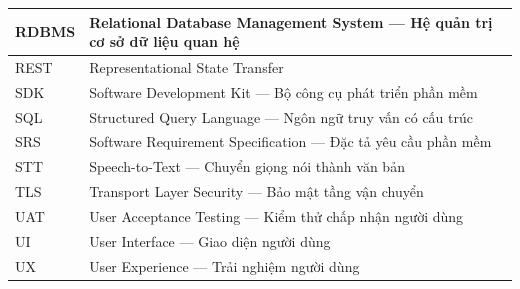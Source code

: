 \begin{tabularx}{\textwidth}{|l|X|}
RDBMS & Relational Database Management System --- Hệ quản trị cơ sở dữ liệu quan hệ \\ \hline
REST & Representational State Transfer \\ \hline
SDK & Software Development Kit --- Bộ công cụ phát triển phần mềm \\ \hline
SQL & Structured Query Language --- Ngôn ngữ truy vấn có cấu trúc \\ \hline
SRS & Software Requirement Specification --- Đặc tả yêu cầu phần mềm \\ \hline
STT & Speech-to-Text --- Chuyển giọng nói thành văn bản \\ \hline
TLS & Transport Layer Security --- Bảo mật tầng vận chuyển \\ \hline
UAT & User Acceptance Testing --- Kiểm thử chấp nhận người dùng \\ \hline
UI & User Interface --- Giao diện người dùng \\ \hline
UX & User Experience --- Trải nghiệm người dùng \\ \hline
\end{tabularx}
